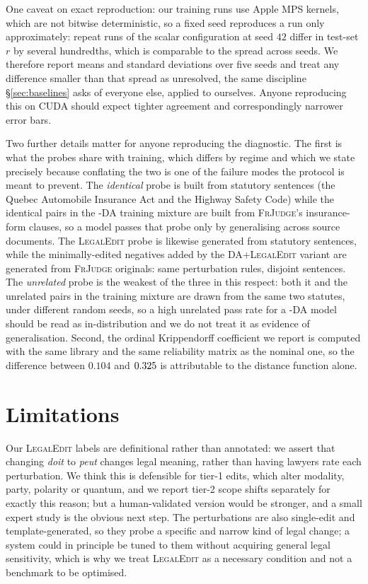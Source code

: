 \documentclass[11pt]{article}
\begin{document}
One caveat on exact reproduction: our training runs use Apple MPS kernels, which
are not bitwise deterministic, so a fixed seed reproduces a run only
approximately: repeat runs of the scalar configuration at seed $42$ differ in
test-set $r$ by several hundredths, which is comparable to the spread across
seeds. We therefore report means and standard deviations over five seeds and
treat any difference smaller than that spread as unresolved, the same discipline
\S\ref{sec:baselines} asks of everyone else, applied to ourselves. Anyone
reproducing this on CUDA should expect tighter agreement and correspondingly
narrower error bars.

Two further details matter for anyone reproducing the diagnostic. The first is
what the probes share with training, which differs by regime and which we state
precisely because conflating the two is one of the failure modes the protocol is
meant to prevent. The \emph{identical} probe is built from statutory sentences
(the Quebec Automobile Insurance Act and the Highway Safety Code) while the
identical pairs in the \textsc{-DA} training mixture are built from
\textsc{FrJudge}'s insurance-form clauses, so a model passes that probe only by
generalising across source documents. The \textsc{LegalEdit} probe is likewise
generated from statutory sentences, while the minimally-edited negatives added
by the \textsc{DA+LegalEdit} variant are generated from \textsc{FrJudge}
originals: same perturbation rules, disjoint sentences. The \emph{unrelated}
probe is the weakest of the three in this respect: both it and the unrelated
pairs in the training mixture are drawn from the same two statutes, under
different random seeds, so a high unrelated pass rate for a \textsc{-DA} model
should be read as in-distribution and we do not treat it as evidence of
generalisation. Second, the ordinal Krippendorff coefficient we report is
computed with the same library and the same reliability matrix as the nominal
one, so the difference between $0.104$ and $0.325$ is attributable to the
distance function alone.

\section{Limitations}
\label{sec:limits}

Our \textsc{LegalEdit} labels are definitional rather than annotated: we assert
that changing \emph{doit} to \emph{peut} changes legal meaning, rather than
having lawyers rate each perturbation. We think this is defensible for tier-1
edits, which alter modality, party, polarity or quantum, and we report tier-2
scope shifts separately for exactly this reason; but a human-validated version
would be stronger, and a small expert study is the obvious next step. The
perturbations are also single-edit and template-generated, so they probe a
specific and narrow kind of legal change; a system could in principle be tuned
to them without acquiring general legal sensitivity, which is why we treat
\textsc{LegalEdit} as a necessary condition and not a benchmark to be optimised.
\end{document}
